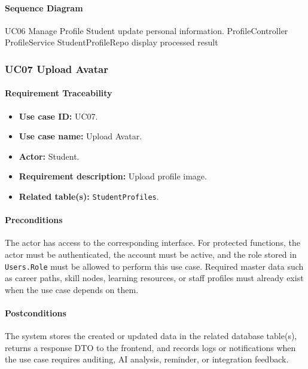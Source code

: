 \paragraph{Sequence Diagram}

\SequenceDiagram
{UC06 Manage Profile}
{Student}
{update personal information.}
{ProfileController}
{ProfileService}
{StudentProfileRepo}
{display processed result}

\subsubsection{UC07 Upload Avatar}

\paragraph{Requirement Traceability}

\begin{itemize}
    \item \textbf{Use case ID:} UC07.
    \item \textbf{Use case name:} Upload Avatar.
    \item \textbf{Actor:} Student.
    \item \textbf{Requirement description:} Upload profile image.
    \item \textbf{Related table(s):} \texttt{StudentProfiles}.
\end{itemize}

\paragraph{Preconditions}

The actor has access to the corresponding interface. For protected functions, the actor must be authenticated, the account must be active, and the role stored in \texttt{Users.Role} must be allowed to perform this use case. Required master data such as career paths, skill nodes, learning resources, or staff profiles must already exist when the use case depends on them.

\paragraph{Postconditions}

The system stores the created or updated data in the related database table(s), returns a response DTO to the frontend, and records logs or notifications when the use case requires auditing, AI analysis, reminder, or integration feedback.

